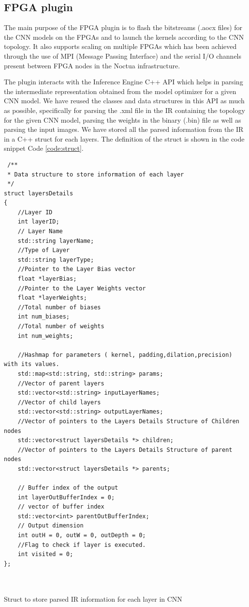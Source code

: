  \subsection{FPGA plugin}
 The main purpose of the FPGA plugin is to flash the bitstreams (.aocx files) for the CNN models on the FPGAs and to launch the kernels according to the CNN topology. It also supports scaling on multiple FPGAs which has been achieved through the use of MPI (Message Passing Interface) and the serial I/O channels present between FPGA nodes in the Noctua infrastructure. 
 
 The plugin interacts with the Inference Engine C++ API which helps in parsing the intermediate representation obtained from the model optimizer for a given CNN model. We have reused the classes and data structures in this API as much as possible, specifically for parsing the .xml file in the IR containing the topology for the given CNN model, parsing the weights in the binary (.bin) file as well as parsing the input images. We have stored all the parsed information from the IR in a C++ struct for each layers. The definition of the struct is shown in the code snippet Code \ref{code:struct}.
 \begin{code}[!htb]
 \begin{verbatim}
 /**
 * Data structure to store information of each layer
 */
struct layersDetails
{
	//Layer ID
	int layerID;
	// Layer Name
	std::string layerName;
	//Type of Layer
	std::string layerType;
	//Pointer to the Layer Bias vector
	float *layerBias;
	//Pointer to the Layer Weights vector
	float *layerWeights;
	//Total number of biases
	int num_biases;
	//Total number of weights
	int num_weights;

	//Hashmap for parameters ( kernel, padding,dilation,precision) with its values.
	std::map<std::string, std::string> params;
	//Vector of parent layers
	std::vector<std::string> inputLayerNames;
	//Vector of child layers
	std::vector<std::string> outputLayerNames;
	//Vector of pointers to the Layers Details Structure of Children nodes
	std::vector<struct layersDetails *> children;
	//Vector of pointers to the Layers Details Structure of parent nodes
	std::vector<struct layersDetails *> parents;

	// Buffer index of the output
	int layerOutBufferIndex = 0;
	// vector of buffer index
	std::vector<int> parentOutBufferIndex;
	// Output dimension
	int outH = 0, outW = 0, outDepth = 0;
	//Flag to check if layer is executed.
	int visited = 0;
};

    
\end{verbatim}
\caption{Struct to store parsed IR information for each layer in CNN}
\label{code:struct}
\end{code}
 
